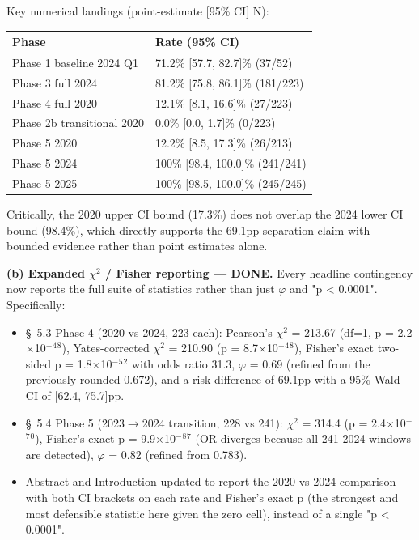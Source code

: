 \documentclass[11pt,a4paper]{article}
\begin{document}
Key numerical landings (point-estimate [95\% CI] N):

\begin{table}[H]
\centering
\small
\begin{tabular}{|l|l|}
\hline
\textbf{Phase} & \textbf{Rate (95\% CI)} \\ \hline
Phase 1 baseline 2024 Q1 & 71.2\% [57.7, 82.7]\% (37/52) \\ \hline
Phase 3 full 2024 & 81.2\% [75.8, 86.1]\% (181/223) \\ \hline
Phase 4 full 2020 & 12.1\% [8.1, 16.6]\% (27/223) \\ \hline
Phase 2b transitional 2020 & 0.0\% [0.0, 1.7]\% (0/223) \\ \hline
Phase 5 2020 & 12.2\% [8.5, 17.3]\% (26/213) \\ \hline
Phase 5 2024 & 100\% [98.4, 100.0]\% (241/241) \\ \hline
Phase 5 2025 & 100\% [98.5, 100.0]\% (245/245) \\ \hline
\end{tabular}
\end{table}

Critically, the 2020 upper CI bound (17.3\%) does not overlap the 2024
lower CI bound (98.4\%), which directly supports the 69.1pp separation
claim with bounded evidence rather than point estimates alone.

\textbf{(b) Expanded $\chi$$^{2}$ / Fisher reporting --- DONE.} Every headline
contingency now reports the full suite of statistics rather than just $\varphi$
and "p < 0.0001". Specifically:

\begin{itemize}
\item \S{}~5.3 Phase 4 (2020 vs 2024, 223 each): Pearson's $\chi$$^{2}$ = 213.67 (df=1, p = 2.2$\times$10$^{-}$$^{4}$$^{8}$), Yates-corrected $\chi$$^{2}$ = 210.90 (p = 8.7$\times$10$^{-}$$^{4}$$^{8}$), Fisher's exact two-sided p = 1.8$\times$10$^{-}$$^{5}$$^{2}$ with odds ratio 31.3, $\varphi$ = 0.69 (refined from the previously rounded 0.672), and a risk difference of 69.1pp with a 95\% Wald CI of [62.4, 75.7]pp.
\item \S{}~5.4 Phase 5 (2023$\rightarrow$2024 transition, 228 vs 241): $\chi$$^{2}$ = 314.4 (p = 2.4$\times$10$^{-}$$^{7}$$^{0}$), Fisher's exact p = 9.9$\times$10$^{-}$$^{8}$$^{7}$ (OR diverges because all 241 2024 windows are detected), $\varphi$ = 0.82 (refined from 0.783).
\item Abstract and Introduction updated to report the 2020-vs-2024 comparison with both CI brackets on each rate and Fisher's exact p (the strongest and most defensible statistic here given the zero cell), instead of a single "p < 0.0001".
\end{itemize}
\end{document}

